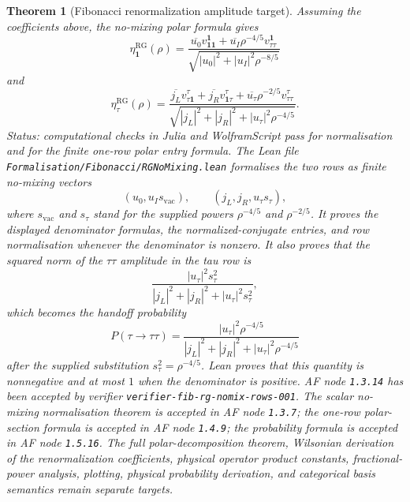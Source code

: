 \documentclass[11pt]{article}
\newtheorem{theorem}[definition]{Theorem}
\begin{document}
\begin{theorem}[Fibonacci renormalization amplitude target]
Assuming the coefficients above, the no-mixing polar formula gives
\[
\eta_{\mathbf 1}^{\mathrm{RG}}(\rho)=
\frac{\overline{u_0}v^{\mathbf 1}_{\mathbf 1\mathbf 1}
+\overline{u_I}\rho^{-4/5}v^{\mathbf 1}_{\tau\tau}}
{\sqrt{|u_0|^2+|u_I|^2\rho^{-8/5}}}
\]
and
\[
\eta_\tau^{\mathrm{RG}}(\rho)=
\frac{\overline{j_L}v^\tau_{\tau\mathbf 1}
+\overline{j_R}v^\tau_{\mathbf 1\tau}
+\overline{u_\tau}\rho^{-2/5}v^\tau_{\tau\tau}}
{\sqrt{|j_L|^2+|j_R|^2+|u_\tau|^2\rho^{-4/5}}}.
\]
Status: computational checks in Julia and WolframScript pass for
normalisation and for the finite one-row polar entry formula. The Lean file
\texttt{Formalisation/Fibonacci/RGNoMixing.lean} formalises the two rows as
finite no-mixing vectors
\[
(u_0,u_I s_{\mathrm{vac}}),\qquad
(j_L,j_R,u_\tau s_\tau),
\]
where \(s_{\mathrm{vac}}\) and \(s_\tau\) stand for the supplied powers
\(\rho^{-4/5}\) and \(\rho^{-2/5}\). It proves the displayed denominator
formulas, the normalized-conjugate entries, and row normalisation whenever
the denominator is nonzero. It also proves that the squared norm of the
\(\tau\tau\) amplitude in the tau row is
\[
\frac{|u_\tau|^2s_\tau^2}
{|j_L|^2+|j_R|^2+|u_\tau|^2s_\tau^2},
\]
which becomes the handoff probability
\[
P(\tau\to\tau\tau)=
\frac{|u_\tau|^2\rho^{-4/5}}
{|j_L|^2+|j_R|^2+|u_\tau|^2\rho^{-4/5}}
\]
after the supplied substitution \(s_\tau^2=\rho^{-4/5}\). Lean proves that
this quantity is nonnegative and at most \(1\) when the denominator is
positive. AF node \texttt{1.3.14} has been accepted by
verifier \texttt{verifier-fib-rg-nomix-rows-001}. The scalar no-mixing
normalisation theorem is accepted in AF node \texttt{1.3.7}; the one-row
polar-section formula is accepted in AF node \texttt{1.4.9}; the probability
formula is accepted in AF node \texttt{1.5.16}. The full
polar-decomposition theorem, Wilsonian derivation of the renormalization
coefficients, physical operator product constants, fractional-power analysis,
plotting, physical probability derivation, and categorical basis semantics
remain separate targets.
\end{theorem}
\end{document}
